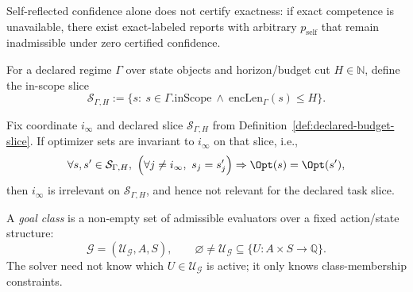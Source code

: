 \begin{proposition}\label{prop:self-confidence-not-certification}
Self-reflected confidence alone does not certify exactness: if exact competence is unavailable, there exist exact-labeled reports with arbitrary $p_{\mathrm{self}}$ that remain inadmissible under zero certified confidence.
\end{proposition}

\begin{definition}\label{def:declared-budget-slice}
For a declared regime $\Gamma$ over state objects and horizon/budget cut $H\in\mathbb{N}$, define the in-scope slice
\[
\mathcal{S}_{\Gamma,H}
:=
\{s:\ s\in\Gamma.\mathrm{inScope}\ \wedge\ \mathrm{encLen}_\Gamma(s)\le H\}.
\]
\end{definition}

\begin{proposition}\label{prop:bounded-slice-meta-irrelevance}
Fix coordinate $i_\infty$ and declared slice $\mathcal{S}_{\Gamma,H}$ from Definition~\ref{def:declared-budget-slice}.
If optimizer sets are invariant to $i_\infty$ on that slice, i.e.,
\[
\forall s,s'\in\mathcal{S}_{\Gamma,H},\ 
\Big(\forall j\neq i_\infty,\ s_j=s'_j\Big)
\Rightarrow
\Opt(s)=\Opt(s'),
\]
then $i_\infty$ is irrelevant on $\mathcal{S}_{\Gamma,H}$, and hence not relevant for the declared task slice.
\end{proposition}

\begin{definition}\label{def:goal-class}
A \emph{goal class} is a non-empty set of admissible evaluators over a fixed action/state structure:
\[
\mathcal{G}=(\mathcal{U}_{\mathcal{G}},A,S),\qquad
\varnothing\neq\mathcal{U}_{\mathcal{G}}\subseteq\{U:A\times S\to\mathbb{Q}\}.
\]
The solver need not know which $U\in\mathcal{U}_{\mathcal{G}}$ is active; it only knows class-membership constraints.
\leanmeta{\LH{IV1}.}
\end{definition}

